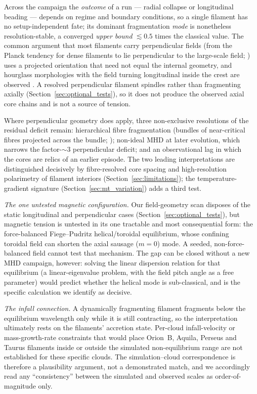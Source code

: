 \documentclass[usenatbib,twoside,twocolumn]{mnras}
\begin{document}
Across the campaign the \emph{outcome} of a run --- radial collapse or longitudinal beading --- depends on regime and boundary conditions, so a single filament has no setup-independent fate; its dominant fragmentation \emph{mode} is nonetheless resolution-stable, a converged \emph{upper bound} $\lesssim0.5$ times the classical value. The common argument that most filaments carry perpendicular fields (from the Planck tendency for dense filaments to lie perpendicular to the large-scale field; \citealt{Planck2016}) uses a projected orientation that need not equal the internal geometry, and hourglass morphologies with the field turning longitudinal inside the crest are observed \citep{Jadhav2026}. A resolved perpendicular filament spindles rather than fragmenting axially (Section~\ref{sec:optional_tests}), so it does not produce the observed axial core chains and is not a source of tension.

Where perpendicular geometry does apply, three non-exclusive resolutions of the residual deficit remain: hierarchical fibre fragmentation (bundles of near-critical fibres projected across the bundle; \citealt{Hacar2013,Hacar2018,Yang2024}); non-ideal MHD at later evolution, which narrows the factor-$\sim3$ perpendicular deficit; and an observational lag in which the cores are relics of an earlier episode. The two leading interpretations are distinguished decisively by fibre-resolved core spacing and high-resolution polarimetry of filament interiors (Section~\ref{sec:limitations}); the temperature-gradient signature (Section~\ref{sec:mt_variation}) adds a third test.

\emph{The one untested magnetic configuration.} Our field-geometry scan disposes of the static longitudinal and perpendicular cases (Section~\ref{sec:optional_tests}), but magnetic tension is untested in its one tractable and most consequential form: the force-balanced Fiege--Pudritz helical/toroidal equilibrium, whose confining toroidal field can shorten the axial sausage ($m=0$) mode. A seeded, non-force-balanced field cannot test that mechanism. The gap can be closed without a new MHD campaign, however: solving the linear dispersion relation for that equilibrium (a linear-eigenvalue problem, with the field pitch angle as a free parameter) would predict whether the helical mode is sub-classical, and is the specific calculation we identify as decisive.

\emph{The infall connection.} A dynamically fragmenting filament fragments below the equilibrium wavelength only while it is still contracting, so the interpretation ultimately rests on the filaments' accretion state. Per-cloud infall-velocity or mass-growth-rate constraints that would place Orion~B, Aquila, Perseus and Taurus filaments inside or outside the simulated non-equilibrium range are not established for these specific clouds. The simulation--cloud correspondence is therefore a plausibility argument, not a demonstrated match, and we accordingly read any ``consistency'' between the simulated and observed scales as order-of-magnitude only.
\end{document}

